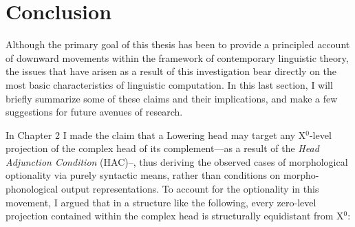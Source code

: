 \section{Conclusion}
Although the primary goal of this thesis has been to provide a principled account of downward movements within the framework of contemporary linguistic theory, the issues that have arisen as a result of this investigation bear directly on the most basic characteristics of linguistic computation. In this last section, I will briefly summarize some of these claims and their implications, and make a few suggestions for future avenues of research.

In Chapter 2 I made the claim that a Lowering head may target any X$^{0}$-level projection of the complex head of its complement---as a result of the {\it Head Adjunction Condition} (HAC)--, thus deriving the observed cases of morphological optionality via purely syntactic means, rather than conditions on morpho-phonological output representations. To account for the optionality in this movement, I argued that in a structure like the following, every zero-level projection contained within the complex head is structurally equidistant from X$^{0}$:

